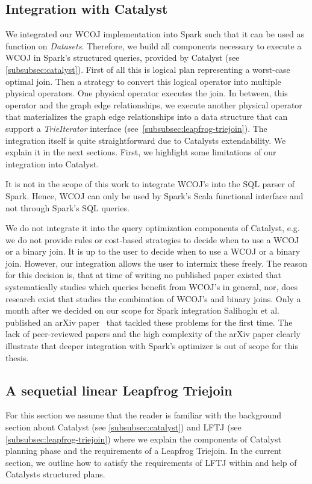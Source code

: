 \subsection{Integration with Catalyst} \label{ssec:integration-with-catalyst}
We integrated our WCOJ implementation into Spark such that it can be used as function on \textit{Datasets}.
Therefore, we build all components necessary to execute a WCOJ in Spark's structured queries, provided by Catalyst (see
\cref{subsubsec:catalyst}).
First of all this is logical plan representing a worst-case optimal join.
Then a strategy to convert this logical operator into multiple physical operators.
One physical operator executes the join.
In between, this operator and the graph edge relationships, we execute another physical operator that materializes
the graph edge relationships into a data structure that can support a \textit{TrieIterator} interface
(see~\cref{subsubsec:leapfrog-triejoin}).
The integration itself is quite straightforward due to Catalysts extendability.
We explain it in the next sections.
First, we highlight some limitations of our integration into Catalyst.

It is not in the scope of this work to integrate WCOJ's into the SQL parser of Spark.
Hence, WCOJ can only be used by Spark's Scala functional interface and not through Spark's SQL queries.

We do not integrate it into the query optimization components of Catalyst, e.g. we do not provide rules or cost-based strategies to
decide when to use a WCOJ or a binary join.
It is up to the user to decide when to use a WCOJ or a binary join.
However, our integration allows the user to intermix these freely.
The reason for this decision is, that at time of writing no published paper existed that systematically studies which queries benefit from
WCOJ's in general, nor, does research exist that studies the combination of WCOJ's and binary joins.
Only a month after we decided on our scope for Spark integration Salihoglu et al. published an arXiv paper~\cite{mhedhbi2019} that
tackled these problems for the first time.
The lack of peer-reviewed papers and the high complexity of the arXiv paper clearly illustrate that deeper integration with
Spark's optimizer is out of scope for this thesis.

\subsection{A sequetial linear Leapfrog Triejoin} \label{subsec:spark-integration-seq}
For this section we assume that the reader is familiar with the background section about Catalyst (see \cref{subsubsec:catalyst}) and
\textsc{LFTJ} (see \cref{subsubsec:leapfrog-triejoin}) where we explain the components of Catalyst planning phase and the requirements
of a Leapfrog Triejoin.
In the current section, we outline how to satisfy the requirements of \textsc{LFTJ} within and help of Catalysts structured plans.

